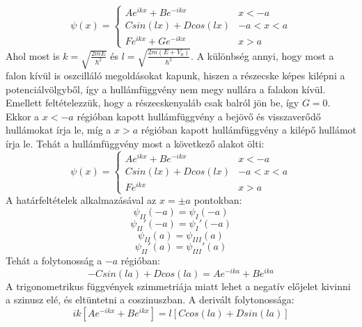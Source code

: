 \documentclass[a4paper,12pt]{article}
\begin{document}
\begin{equation}
\psi(x) = \begin{cases}
    A e^{i k x} + B e^{- i k x} & x < -a \\
    C sin(l x) + D cos(l x) & -a < x < a \\
    F e^{i k x} + G e^{- i k x} & x > a
    \end{cases}
\end{equation}
Ahol most is $k = \sqrt{\frac{2mE}{\hbar^2}}$ és $l = \sqrt{\frac{2m(E + V_0)}{\hbar^2}}$. A különbség annyi, hogy most
a falon kívül is oszcilláló megoldásokat kapunk, hiszen a részecske képes kilépni a potenciálvölgyből, így a hullámfüggvény nem megy nullára a falakon kívül.
Emellett feltételezzük, hogy a részecskenyaláb csak balról jön be, így $G = 0$. Ekkor a $x < -a$ régióban kapott hullámfüggvény
a bejövő és visszaverődő hullámokat írja le, míg a $x > a$ régióban kapott hullámfüggvény a kilépő hullámot írja le.
Tehát a hullámfüggvény most a következő alakot ölti:
\begin{equation}
\psi(x) = \begin{cases}
    A e^{i k x} + B e^{- i k x} & x < -a \\
    C sin(l x) + D cos(l x) & -a < x < a \\
    F e^{i k x} & x > a
    \end{cases}
\end{equation}
A határfeltételek alkalmazásával az $x = \pm a$ pontokban:
\begin{equation}
    \psi_{II}(-a) = \psi_{I}(-a)
\end{equation}
\begin{equation}
    \psi_{II}'(-a) = \psi_{I}'(-a)
\end{equation}
\begin{equation}
    \psi_{II}(a) = \psi_{III}(a)
\end{equation}
\begin{equation}
    \psi_{II}'(a) = \psi_{III}'(a)
\end{equation}
Tehát a folytonosság a $-a$ régióban:
\begin{equation}
    - C sin(l a) + D cos(l a) = A e^{- i k a} + B e^{i k a}
\end{equation}
A trigonometrikus függvények szimmetriája miatt lehet a negatív előjelet kivinni a szinusz elé, és eltüntetni a coszinuszban. A derivált folytonossága:
\begin{equation}
    ik \left[Ae^{- i k x} + B e^{i k x}\right] = l \left[C cos(l a) + D sin(l a)\right]
\end{equation}
\end{document}
